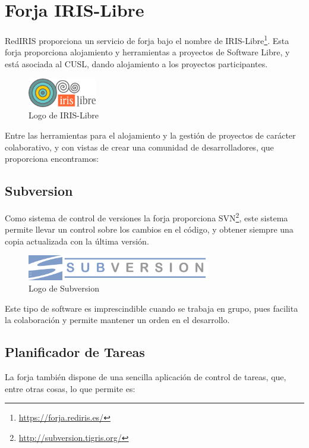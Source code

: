 \section{Forja IRIS-Libre}

RedIRIS proporciona un servicio de forja bajo el nombre de
IRIS-Libre\footnote{\url{https://forja.rediris.es/}}. Esta forja proporciona
alojamiento y herramientas a proyectos de Software Libre, y está asociada al
CUSL, dando alojamiento a los proyectos participantes.

\begin{figure}[H]
 \centering
 \includegraphics[width=30mm]{figuras/cap5/iris_libre.png}
 \caption{Logo de IRIS-Libre}
\end{figure}

Entre las herramientas para el alojamiento y la gestión de proyectos de carácter
colaborativo, y con vistas de crear una comunidad de desarrolladores, que
proporciona encontramos:

\subsection{Subversion}

Como sistema de control de versiones la forja proporciona
SVN\footnote{\url{http://subversion.tigris.org/}}, este sistema permite llevar
un control sobre los cambios en el código, y obtener siempre una copia
actualizada con la última versión.

\begin{figure}[H]
 \centering
 \includegraphics[width=80mm]{figuras/cap5/svn.png}
 \caption{Logo de Subversion}
\end{figure}

Este tipo de software es imprescindible cuando se trabaja en grupo, pues
facilita la colaboración y permite mantener un orden en el desarrollo.

\subsection{Planificador de Tareas}

La forja también dispone de una sencilla aplicación de control de tareas, que,
entre otras cosas, lo que permite es:

